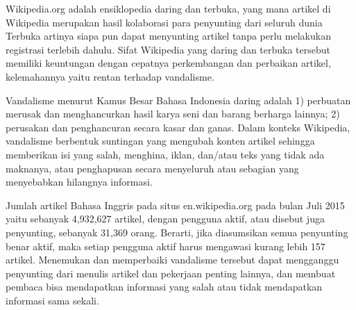 Wikipedia.org adalah ensiklopedia daring dan terbuka, yang mana artikel di
Wikipedia merupakan hasil kolaborasi para penyunting dari seluruh dunia
Terbuka artinya siapa pun dapat menyunting artikel tanpa perlu melakukan
registrasi terlebih dahulu.
Sifat Wikipedia yang daring dan terbuka tersebut memiliki keuntungan dengan
cepatnya perkembangan dan perbaikan artikel, kelemahannya yaitu rentan terhadap
vandalisme.

Vandalisme menurut Kamus Besar Bahasa Indonesia daring adalah
1) perbuatan merusak dan menghancurkan hasil karya seni dan barang berharga
lainnya;
2) perusakan dan penghancuran secara kasar dan ganas.
Dalam konteks Wikipedia, vandalisme berbentuk suntingan yang mengubah
konten artikel sehingga memberikan isi yang salah, menghina, iklan,
dan/atau teks yang tidak ada maknanya, atau penghapusan secara
menyeluruh atau sebagian yang menyebabkan hilangnya informasi.

Jumlah artikel Bahasa Inggris pada situs en.wikipedia.org pada bulan Juli 2015
yaitu sebanyak 4,932,627 artikel, dengan pengguna aktif, atau disebut juga
penyunting, sebanyak 31,369 orang.
Berarti, jika diasumsikan semua penyunting benar aktif, maka setiap pengguna
aktif harus mengawasi kurang lebih 157 artikel.
Menemukan dan memperbaiki vandalisme tersebut dapat mengganggu penyunting dari
menulis artikel dan pekerjaan penting lainnya, dan membuat pembaca bisa
mendapatkan informasi yang salah atau tidak mendapatkan informasi sama sekali.
